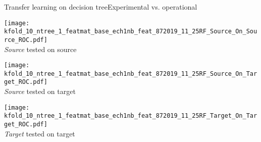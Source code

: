 \begin{frame}{Transfer learning on decision tree}{Experimental vs. operational}
\renewcommand{\ratio}{0.32}
\begin{minipage}[t]{\linewidth}
    \centering
    \begin{minipage}[t]{\ratio\linewidth}
        \centering
        \texttt{[image: kfold\_10\_ntree\_1\_featmat\_base\_ech1nb\_feat\_872019\_11\_25RF\_Source\_On\_Source\_ROC.pdf]}\\
        {\small \emph{Source} tested on source}
    \end{minipage}
    \begin{minipage}[t]{\ratio\linewidth}
        \centering
        \texttt{[image: kfold\_10\_ntree\_1\_featmat\_base\_ech1nb\_feat\_872019\_11\_25RF\_Source\_On\_Target\_ROC.pdf]}\\
        {\small \emph{Source} tested on target}
    \end{minipage}
    \begin{minipage}[t]{\ratio\linewidth}
        \centering
        \texttt{[image: kfold\_10\_ntree\_1\_featmat\_base\_ech1nb\_feat\_872019\_11\_25RF\_Target\_On\_Target\_ROC.pdf]}\\
        {\small \emph{Target} tested on target}
    \end{minipage}
\end{minipage}

\end{frame}

